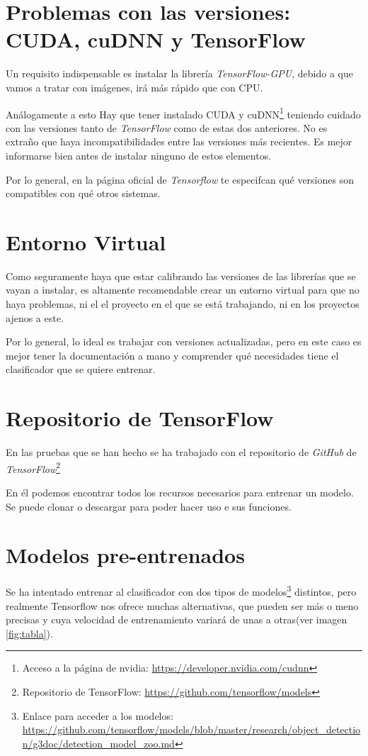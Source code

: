 \section{Problemas con las versiones: CUDA, cuDNN y TensorFlow}
Un requisito indispensable es instalar la librería   \textit{TensorFlow-GPU}, debido a que vamos a tratar con imágenes, irá más rápido que con CPU.

Análogamente a esto Hay que tener instalado CUDA y cuDNN\footnote{Acceso a la página de nvidia: \url{https://developer.nvidia.com/cudnn}} teniendo cuidado con las versiones tanto de \textit{TensorFlow} como de estas dos anteriores. No es extraño que haya incompatibilidades entre las versiones más recientes. Es mejor informarse bien antes de instalar ninguno de estos elementos.

Por lo general, en la página oficial de \textit{Tensorflow} te especifcan qué versiones son compatibles con qué otros sistemas\cite{ten}.

\section{Entorno Virtual}
Como seguramente haya que estar calibrando las versiones de las librerías que se vayan a instalar, es altamente recomendable crear un entorno virtual para que no haya problemas, ni el el proyecto en el que se está trabajando, ni en los proyectos ajenos a este.

Por lo general, lo ideal es trabajar con versiones actualizadas, pero en este caso es mejor tener la documentación a mano y comprender qué necesidades tiene el clasificador que se quiere entrenar.

\section{Repositorio de TensorFlow}
En las pruebas que se han hecho se ha trabajado con el repositorio de \textit{GitHub} de \textit{TensorFlow}\footnote{Repositorio de TensorFlow: \url{https://github.com/tensorflow/models}}

En él podemos encontrar todos los recursos necesarios para entrenar un modelo.
Se puede clonar o descargar para poder hacer uso e sus funciones.

\section{Modelos pre-entrenados}
Se ha intentado entrenar al clasificador con dos tipos de modelos\footnote{Enlace para acceder a los modelos: \url{https://github.com/tensorflow/models/blob/master/research/object_detection/g3doc/detection_model_zoo.md}} distintos, pero realmente Tensorflow nos ofrece muchas alternativas, que pueden ser más o meno precisas y cuya velocidad de entrenamiento variará de unas a otras(ver imagen \ref{fig:tabla}).

